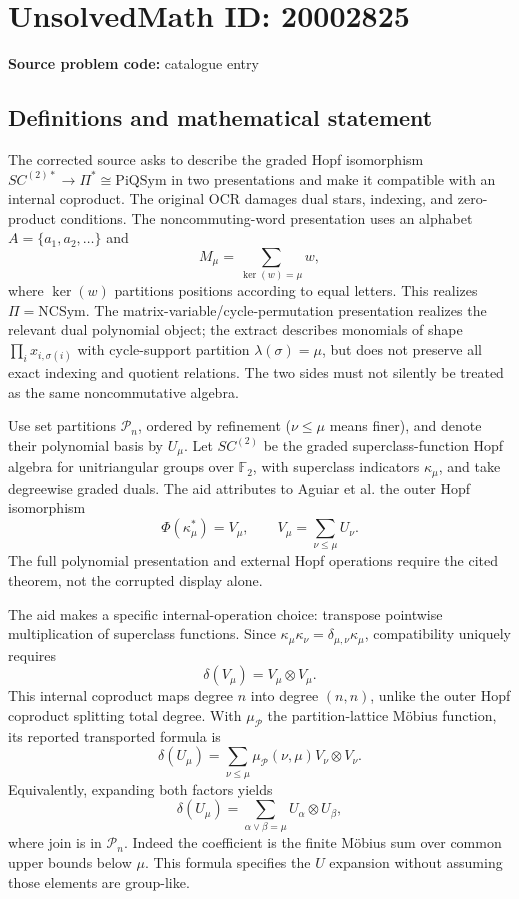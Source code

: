 \documentclass[11pt]{article}
\newcommand{\F}{\mathbb{F}}
\begin{document}
\section*{UnsolvedMath ID: 20002825}
\textbf{Source problem code:} catalogue entry
\subsection{Definitions and mathematical statement}
The corrected source asks to describe the graded Hopf isomorphism $SC^{(2)*}\to\Pi^*\cong\mathrm{PiQSym}$ in two presentations and make it compatible with an internal coproduct. The original OCR damages dual stars, indexing, and zero-product conditions. The noncommuting-word presentation uses an alphabet $A=\{a_1,a_2,\ldots\}$ and
\[
 M_\mu=\sum_{\ker(w)=\mu}w,
\]
where $\ker(w)$ partitions positions according to equal letters. This realizes $\Pi=\mathrm{NCSym}$. The matrix-variable/cycle-permutation presentation realizes the relevant dual polynomial object; the extract describes monomials of shape $\prod_i x_{i,\sigma(i)}$ with cycle-support partition $\lambda(\sigma)=\mu$, but does not preserve all exact indexing and quotient relations. The two sides must not silently be treated as the same noncommutative algebra.

Use set partitions $\mathcal P_n$, ordered by refinement ($\nu\le\mu$ means finer), and denote their polynomial basis by $U_\mu$. Let $SC^{(2)}$ be the graded superclass-function Hopf algebra for unitriangular groups over $\F_2$, with superclass indicators $\kappa_\mu$, and take degreewise graded duals. The aid attributes to Aguiar et al. the outer Hopf isomorphism
\[
 \Phi(\kappa_\mu^*)=V_\mu,\qquad
 V_\mu=\sum_{\nu\le\mu}U_\nu.
\]
The full polynomial presentation and external Hopf operations require the cited theorem, not the corrupted display alone.

The aid makes a specific internal-operation choice: transpose pointwise multiplication of superclass functions. Since $\kappa_\mu\kappa_\nu=\delta_{\mu,\nu}\kappa_\mu$, compatibility uniquely requires
\[
 \delta(V_\mu)=V_\mu\otimes V_\mu.
\]
This internal coproduct maps degree $n$ into degree $(n,n)$, unlike the outer Hopf coproduct splitting total degree. With $\mu_{\mathcal P}$ the partition-lattice M\"obius function, its reported transported formula is
\[
 \delta(U_\mu)=\sum_{\nu\le\mu}\mu_{\mathcal P}(\nu,\mu)
 V_\nu\otimes V_\nu.
\]
Equivalently, expanding both factors yields
\[
 \delta(U_\mu)=\sum_{\alpha\vee\beta=\mu}U_\alpha\otimes U_\beta,
\]
where join is in $\mathcal P_n$. Indeed the coefficient is the finite M\"obius sum over common upper bounds below $\mu$. This formula specifies the $U$ expansion without assuming those elements are group-like.
\end{document}
